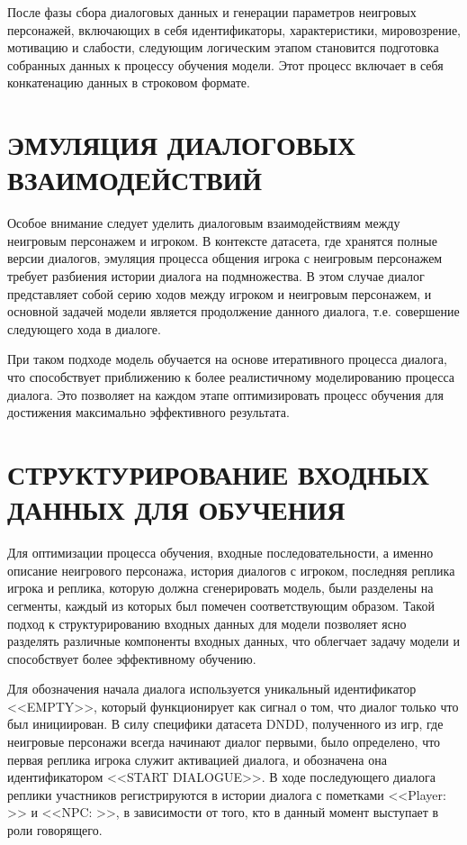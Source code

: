 После фазы сбора диалоговых данных и генерации параметров неигровых персонажей, включающих в себя идентификаторы, характеристики, мировозрение, мотивацию и слабости, следующим логическим этапом становится подготовка собранных данных к процессу обучения модели. Этот процесс включает в себя конкатенацию данных в строковом формате.

\section{ЭМУЛЯЦИЯ ДИАЛОГОВЫХ ВЗАИМОДЕЙСТВИЙ}

Особое внимание следует уделить диалоговым взаимодействиям между неигровым персонажем и игроком. В контексте датасета, где хранятся полные версии диалогов, эмуляция процесса общения игрока с неигровым персонажем требует разбиения истории диалога на подмножества. В этом случае диалог представляет собой серию ходов между игроком и неигровым персонажем, и основной задачей модели является продолжение данного диалога, т.е. совершение следующего хода в диалоге.

При таком подходе модель обучается на основе итеративного процесса диалога, что способствует приближению к более реалистичному моделированию процесса диалога. Это позволяет на каждом этапе оптимизировать процесс обучения для достижения максимально эффективного результата.

\section{СТРУКТУРИРОВАНИЕ ВХОДНЫХ ДАННЫХ ДЛЯ ОБУЧЕНИЯ}

Для оптимизации процесса обучения, входные последовательности, а именно описание неигрового персонажа, история диалогов с игроком, последняя реплика игрока и реплика, которую должна сгенерировать модель, были разделены на сегменты, каждый из которых был помечен соответствующим образом. Такой подход к структурированию входных данных для модели позволяет ясно разделять различные компоненты входных данных, что облегчает задачу модели и способствует более эффективному обучению.

Для обозначения начала диалога используется уникальный идентификатор <<EMPTY>>, который функционирует как сигнал о том, что диалог только что был инициирован. В силу специфики датасета DNDD, полученного из игр, где неигровые персонажи всегда начинают диалог первыми, было определено, что первая реплика игрока служит активацией диалога, и обозначена она идентификатором <<START DIALOGUE>>. В ходе последующего диалога реплики участников регистрируются в истории диалога с пометками <<Player: >> и <<NPC: >>, в зависимости от того, кто в данный момент выступает в роли говорящего.

